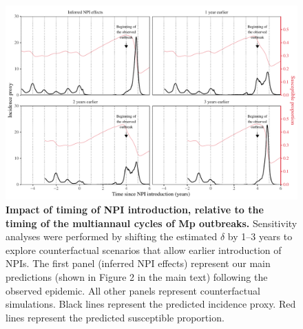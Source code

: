 \documentclass[12pt]{article}
\begin{document}
\begin{figure}[!ht]
\includegraphics[width=\textwidth]{../figure3/figure3_cyclic.pdf}
\caption{
\textbf{Impact of timing of NPI introduction, relative to the timing of the multiannaul cycles of Mp outbreaks.}
Sensitivity analyses were performed by shifting the estimated $\delta$ by 1--3 years to explore counterfactual scenarios that allow earlier introduction of NPIs.
The first panel (inferred NPI effects) represent our main predictions (shown in Figure 2 in the main text) following the observed epidemic.
All other panels represent counterfactual simulations.
Black lines represent the predicted incidence proxy.
Red lines represent the predicted susceptible proportion.
}
\end{figure}

\pagebreak



\end{document}
